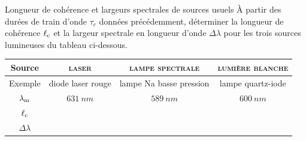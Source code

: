 \documentclass[12pt,fancy]{cours}
\begin{document}
\begin{exemple}{Longueur de cohérence et largeurs spectrales de sources usuels}
  À partir des durées de train d'onde $\tau_c$ données précédemment, déterminer la longueur de cohérence $\ell_{\rm c}$ et la largeur spectrale en longueur d'onde $\Delta \lambda$ pour les trois sources lumineuses du tableau ci-dessous.
    \begin{center}
      \begin{tabular}{|c|c|c|c|}
        \hline
        Source & \textsc{laser} & \textsc{lampe spectrale} & \textsc{lumière blanche} \\
        \hline
        Exemple & diode laser rouge & lampe Na basse pression & lampe quartz-iode \\
        \hline
        $\lambda_{\rm m}$ & $\SI{631}{nm}$ & $\SI{589}{nm}$ &  $\SI{600}{nm}$\\
        \hline
        $\ell_{\rm c}$ &  &  &  \\
        \hline
        $\Delta \lambda$ &  &  & \\
        \hline
      \end{tabular}
    \end{center}
\end{exemple}
\end{document}
